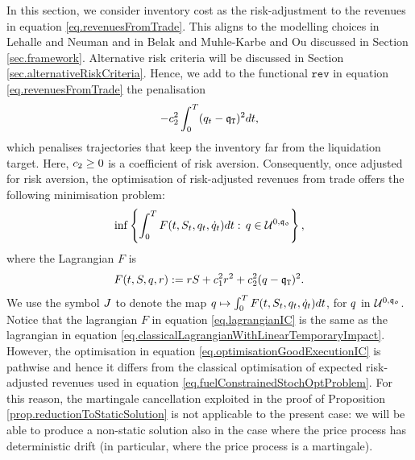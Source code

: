 \documentclass[10pt,a4paper]{article}
\begin{document}
	In this section, we consider inventory cost as the risk-adjustment to the revenues in equation \eqref{eq.revenuesFromTrade}. This aligns to the modelling choices in Lehalle and Neuman \cite{LN19inc} and in Belak and Muhle-Karbe and Ou \cite{BMO18opt} discussed in Section \ref{sec.framework}. Alternative risk criteria will be discussed in Section \ref{sec.alternativeRiskCriteria}. Hence, we  add to the functional $\mathtt{rev}$ in equation \eqref{eq.revenuesFromTrade} the penalisation 
	\begin{equation}\label{eq.classicalRiskAversion}
	-c_{2}^{2} \int_{0}^{T} (q_t- \mathfrak{q}_{\mathtt{T} })^{2} dt,
	\end{equation}
	which penalises trajectories that keep the inventory far from the liquidation target. Here, $c_{2}\geq 0$ is a coefficient of risk aversion. Consequently, once adjusted for risk aversion, the optimisation of risk-adjusted revenues from trade  offers the following minimisation problem:
	\begin{equation}\label{eq.optimisationGoodExecutionIC}
	\inf \left\lbrace
	\int_{0}^{T} F (t,S_t, q_t,\dot{q}_{t} )dt: \,  q \in \mathcal{U}^{0,\mathfrak{q_0}}
	\right\rbrace,
	\end{equation}
	where the Lagrangian $F$ is 
	\begin{equation}\label{eq.lagrangianIC}
	F(t,S,q,r):= rS + c_{1}^{2} r^{2} +c_{2}^{2} (q-\mathfrak{q}_{\mathtt{T} })^{2}.
	\end{equation}
	We use the symbol $J$ to denote the map $q  \mapsto \int_{0}^{T} F (t,S_t, q_t,\dot{q}_{t} )dt$, for $q$ in $\mathcal{U}^{0,\mathfrak{q_0}}$. 
	Notice that the lagrangian $F$ in equation \eqref{eq.lagrangianIC} is the same as the lagrangian in equation \eqref{eq.classicalLagrangianWithLinearTemporaryImpact}. However, the optimisation in equation \eqref{eq.optimisationGoodExecutionIC} is pathwise and hence it  differs from the classical optimisation of expected risk-adjusted revenues used in equation \eqref{eq.fuelConstrainedStochOptProblem}. For this reason, the martingale cancellation exploited in the proof of Proposition \ref{prop.reductionToStaticSolution} is not applicable to the  present case: we will be able to produce a non-static solution also in the case where the price process has deterministic drift (in particular, where the price process is a martingale). 
	
\end{document}
